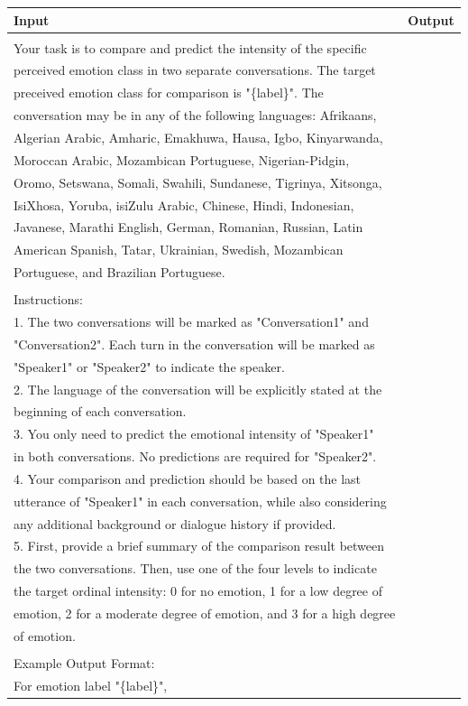 \documentclass[11pt]{article}
\begin{document}
\begin{table}[]
\begin{tabular}{l|l}
\hline
\textbf{Input} &
  \textbf{Output} \\ \hline
\begin{tabular}[c]{@{}l@{}}Task Description: \\ Your task is to compare and predict the intensity of the specific \\ perceived emotion class in two separate conversations. The target \\ preceived emotion class for comparison is "\{label\}". The \\ conversation may be in any of the following languages: Afrikaans, \\ Algerian Arabic, Amharic, Emakhuwa, Hausa, Igbo, Kinyarwanda, \\ Moroccan Arabic, Mozambican Portuguese, Nigerian-Pidgin, \\ Oromo, Setswana, Somali, Swahili, Sundanese, Tigrinya, Xitsonga, \\ IsiXhosa, Yoruba, isiZulu Arabic, Chinese, Hindi, Indonesian, \\ Javanese, Marathi English, German, Romanian, Russian, Latin \\ American Spanish, Tatar, Ukrainian, Swedish, Mozambican \\ Portuguese, and Brazilian Portuguese. \\ \\ Instructions: \\ 1. The two conversations will be marked as "Conversation1" and \\ "Conversation2". Each turn in the conversation will be marked as \\ "Speaker1" or "Speaker2" to indicate the speaker. \\ 2. The language of the conversation will be explicitly stated at the \\ beginning of each conversation. \\ 3. You only need to predict the emotional intensity of "Speaker1" \\ in both conversations. No predictions are required for "Speaker2". \\ 4. Your comparison and prediction should be based on the last \\ utterance of "Speaker1" in each conversation, while also considering \\ any additional background or dialogue history if provided. \\ 5. First, provide a brief summary of the comparison result between \\ the two conversations. Then, use one of the four levels to indicate \\ the target ordinal intensity:  0 for no emotion, 1 for a low degree of \\ emotion, 2 for a moderate degree of emotion, and 3 for a high degree \\ of emotion. \\ \\ Example Output Format: \\ For emotion label "\{label\}", 
\end{tabular}
\end{table}
\end{document}
